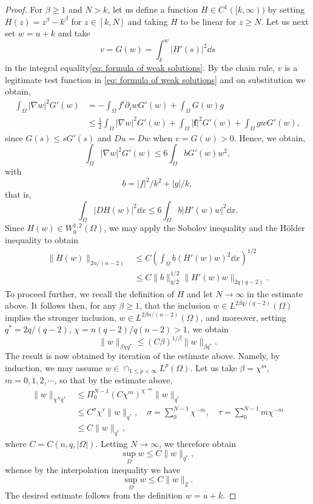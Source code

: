 \begin{proof}
	For $\beta\geq1$ and $N>k$, let us define a function $H\in C^1([k,\infty))$ by setting
	$H(z) = z^\beta - k^\beta$ for $z\in[k,N]$ and taking $H$ to be linear for $z\geq N$. 
	Let us next set $w=u+k$ and take
	\begin{equation*}
		v = G(w) = \int_k^w|H'(s)|^2\dd s 
	\end{equation*} 
	in the integral equality\eqref{eq: formula of weak solutions}. 
	By the chain rule, $v$ is a legitimate test function in \eqref{eq: formula of weak solutions}
	and on substitution we obtain,
	\begin{align*}
		\int_\Omega |\nabla w|^2 G'(w) &= - \int_\Omega f^i\partial_iwG'(w) 
			+ \int_\Omega G(w)g\\
			&\leq \frac{1}{2}\int_\Omega |\nabla w|^2G'(w) + \int_\Omega |\mathbf{f}|^2G'(w)
				+ \int_\Omega gwG'(w), 
	\end{align*}
	since $G(s)\leq sG'(s)$ and $Du = Dw$ when $v = G(w) >0$. Hence, we obtain,
	\[
		\int_\Omega |\nabla w|^2 G'(w) \leq 6\int_\Omega b G'(w)w^2,
	\]
	with 
	\[
		b = |f|^2/k^2 + |g|/k,
	\]
	that is,
	\[
		\int_\Omega |DH(w)|^2\dd x \leq 6\int_\Omega b|H'(w)w|^2\dd x.
	\]
	Since $H(w)\in W^{1,2}_0(\Omega)$, we may apply the Sobolev inequality and the H\"older inequality to obtain 
	\begin{align*}
		\|H(w)\|_{2n/(n-2)}&\leq C\left(\int_\Omega b(H'(w)w)^2\dd x\right)^{1/2}\\
		&\leq C\|b\|_{q/2}^{1/2} \|H'(w)w\|_{2q(q-2)}.
	\end{align*}
	To proceed further, we recall the definition of $H$ and let $N\to\infty$ in the estimate above.
	It follows then, for any $\beta\geq1$, 
	that the inclusion $w\in L^{2\beta q/(q-2)}(\Omega)$ implies the stronger inclusion, $w\in L^{2\beta n/(n-2)}(\Omega)$, 
	and moreover, setting $q^\ast = 2q/(q-2)$, $\chi=n(q-2)/q(n-2)>1$, we obtain
	\[
		\|w\|_{\beta\chi q^\ast} \leq (C\beta)^{1/\beta}\|w\|_{\beta q^\ast}.
	\] 
	The result is now obtained by iteration of the estimate above. 
	Namely, by induction, we may assume $w\in\cap_{1\leq p<\infty}L^p(\Omega)$. 
	Let us take $\beta = \chi^m$, $m=0,1,2,\cdots$, so that by the estimate above,
	\begin{align*}
		\|w\|_{\chi^N q^\ast} &\leq \Pi_0^{N-1}(C\chi^{m})^{\chi^{-m}}\|w\|_{q^\ast}\\
			&\leq C^{\sigma}\chi^\tau\|w\|_{q^\ast},\quad \sigma = \sum_0^{N-1}\chi^{-m},
				\quad \tau = \sum_0^{N-1}m\chi^{-m}\\
			&\leq C\|w\|_{q^\ast},
	\end{align*}
	where $C=C(n,q,|\Omega|)$. Letting $N\to\infty$, we therefore obtain
	\[
		\sup_\Omega w \leq C\|w\|_{q^\ast},
	\]
	whence by the interpolation inequality we have
	\[
		\sup_\Omega w \leq C\|w\|_2.
	\]
	The desired estimate follows from the definition $w = u + k$.
\end{proof}

